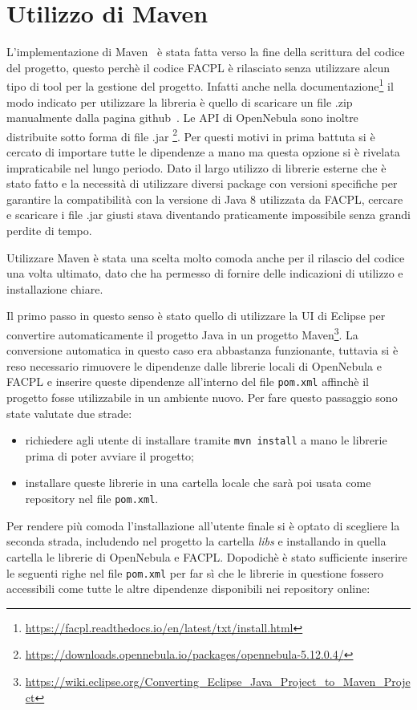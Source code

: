 \section{Utilizzo di Maven} \label{sec:maven}
L'implementazione di Maven~\cite{maven} è stata fatta verso la fine della scrittura del codice del progetto, questo perchè il codice FACPL è rilasciato senza utilizzare alcun tipo di tool per la gestione del progetto. Infatti anche nella documentazione\footnote{\url{https://facpl.readthedocs.io/en/latest/txt/install.html}} il modo indicato per utilizzare la libreria è quello di scaricare un file .zip manualmente dalla pagina github~\cite{facpl-github}. Le API di OpenNebula sono inoltre distribuite sotto forma di file .jar \footnote{\url{https://downloads.opennebula.io/packages/opennebula-5.12.0.4/}}. Per questi motivi in prima battuta si è cercato di importare tutte le dipendenze a mano ma questa opzione si è rivelata impraticabile nel lungo periodo. Dato il largo utilizzo di librerie esterne che è stato fatto e la necessità di utilizzare diversi package con versioni specifiche per garantire la compatibilità con la versione di Java 8 utilizzata da FACPL, cercare e scaricare i file .jar giusti stava diventando praticamente impossibile senza grandi perdite di tempo.\par Utilizzare Maven è stata una scelta molto comoda anche per il rilascio del codice una volta ultimato, dato che ha permesso di fornire delle indicazioni di utilizzo e installazione chiare.\par
Il primo passo in questo senso è stato quello di utilizzare la UI di Eclipse per convertire automaticamente il progetto Java in un progetto Maven\footnote{\url{https://wiki.eclipse.org/Converting_Eclipse_Java_Project_to_Maven_Project}}. La conversione automatica in questo caso era abbastanza funzionante, tuttavia si è reso necessario rimuovere le dipendenze dalle librerie locali di OpenNebula e FACPL e inserire queste dipendenze all'interno del file \texttt{pom.xml} affinchè il progetto fosse utilizzabile in un ambiente nuovo. Per fare questo passaggio sono state valutate due strade:
\begin{itemize}
    \item richiedere agli utente di installare tramite \texttt{mvn install} a mano le librerie prima di poter avviare il progetto;
    \item installare queste librerie in una cartella locale che sarà poi usata come repository nel file \texttt{pom.xml}.
\end{itemize}
Per rendere più comoda l'installazione all'utente finale si è optato di scegliere la seconda strada, includendo nel progetto la cartella \emph{libs} e installando in quella cartella le librerie di OpenNebula e FACPL. Dopodichè è stato sufficiente inserire le seguenti righe nel file \texttt{pom.xml} per far sì che le librerie in questione fossero accessibili come tutte le altre dipendenze disponibili nei repository online:
